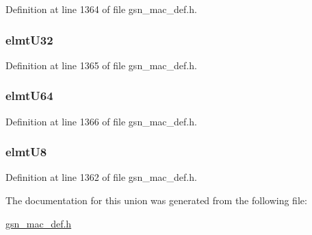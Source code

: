 Definition at line 1364 of file gsn\_\-mac\_\-def.h.

\hypertarget{a00117_ad34e843cade6b7b52696608f3aaff89c}{
\subsubsection[{elmtU32}]{ {\bf elmtU32}}}
\label{a00117_ad34e843cade6b7b52696608f3aaff89c}


Definition at line 1365 of file gsn\_\-mac\_\-def.h.

\hypertarget{a00117_ad18a6084bfb610ff42d000f05b3daacf}{
\subsubsection[{elmtU64}]{ {\bf elmtU64}}}
\label{a00117_ad18a6084bfb610ff42d000f05b3daacf}


Definition at line 1366 of file gsn\_\-mac\_\-def.h.

\hypertarget{a00117_a212ce2e0f176300a69b7faf9970cb219}{
\subsubsection[{elmtU8}]{ {\bf elmtU8}}}
\label{a00117_a212ce2e0f176300a69b7faf9970cb219}


Definition at line 1362 of file gsn\_\-mac\_\-def.h.



The documentation for this union was generated from the following file:\begin{DoxyCompactItemize}
\item 
\hyperlink{a00522}{gsn\_\-mac\_\-def.h}\end{DoxyCompactItemize}
